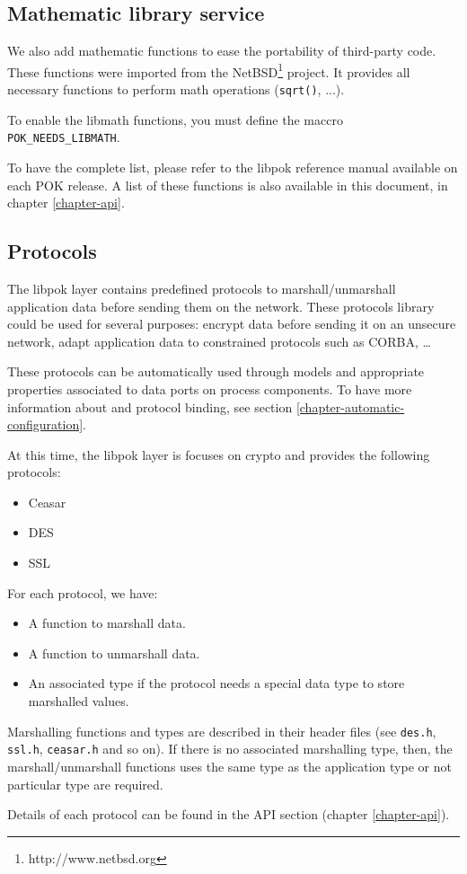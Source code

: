    \subsection{Mathematic library service}
   We also add mathematic functions to ease the portability of third-party code.
   These functions were imported from the NetBSD\footnote{http://www.netbsd.org}
   project. It provides all necessary functions to perform math operations
   (\texttt{sqrt()}, ...).

   To enable the libmath functions, you must define the maccro
   \texttt{POK\_NEEDS\_LIBMATH}.

   To have the complete list, please refer to the libpok reference manual
   available on each POK release. A list of these functions is also available in
   this document, in chapter \ref{chapter-api}.


   \subsection{Protocols}
   The libpok layer contains predefined protocols to marshall/unmarshall
   application data before sending them on the network. These protocols library
   could be used for several purposes: encrypt data before sending it on an
   unsecure network, adapt application data to constrained protocols such as
   CORBA, \ldots

   These protocols can be automatically used through \aadl models and
   appropriate properties associated to \aadl data ports on \aadl process
   components. To have more information about \aadl and protocol binding, see
   section \ref{chapter-automatic-configuration}.

   At this time, the libpok layer is focuses on crypto and provides the following protocols:
   \begin{itemize}
      \item
         Ceasar
      \item
         DES
      \item
         SSL
   \end{itemize}

   For each protocol, we have:
   \begin{itemize}
      \item
         A function to marshall data.
      \item
         A function to unmarshall data.
      \item
         An associated type if the protocol needs a special data type to store
         marshalled values.
   \end{itemize}

   Marshalling functions and types are described in their header files (see
   \texttt{des.h}, \texttt{ssl.h}, \texttt{ceasar.h} and so on). If there is no
   associated marshalling type, then, the marshall/unmarshall functions uses the
   same type as the application type or not particular type are required.


   Details of each protocol can be found in the API section (chapter
   \ref{chapter-api}).
